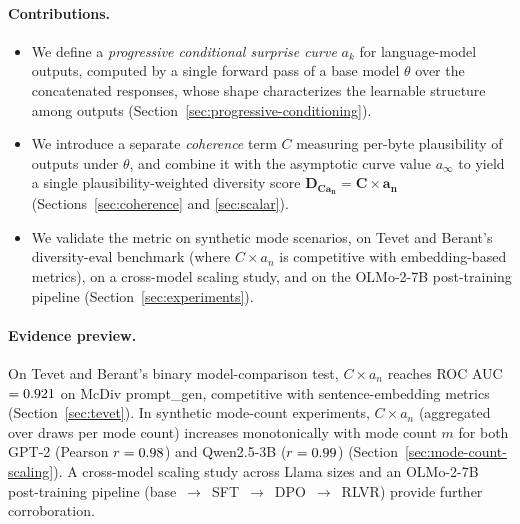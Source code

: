 \paragraph{Contributions.}
\begin{itemize}[leftmargin=*, itemsep=2pt]
  \item We define a \emph{progressive conditional surprise curve} $a_k$ for language-model outputs, computed by a single forward pass of a base model $\theta$ over the concatenated responses, whose shape characterizes the learnable structure among outputs (Section~\ref{sec:progressive-conditioning}).
  \item We introduce a separate \emph{coherence} term $C$ measuring per-byte plausibility of outputs under $\theta$, and combine it with the asymptotic curve value $a_\infty$ to yield a single plausibility-weighted diversity score $\mathbf{D_{Ca_n} = C \times a_n}$ (Sections~\ref{sec:coherence} and \ref{sec:scalar}).
  \item We validate the metric on synthetic mode scenarios, on Tevet and Berant's diversity-eval benchmark (where $C \times a_n$ is competitive with embedding-based metrics), on a cross-model scaling study, and on the OLMo-2-7B post-training pipeline (Section~\ref{sec:experiments}).
\end{itemize}

\paragraph{Evidence preview.}
On Tevet and Berant's binary model-comparison test, $C \times a_n$ reaches ROC AUC $= 0.921{}$ on McDiv prompt\_gen, competitive with sentence-embedding metrics (Section~\ref{sec:tevet}).
In synthetic mode-count experiments, $C \times a_n$ (aggregated over \modeCountNDraws{} draws per mode count) increases monotonically with mode count $m$ for both GPT-2 (Pearson $r = 0.98{}$) and Qwen2.5-3B ($r = 0.99{}$) (Section~\ref{sec:mode-count-scaling}).
A cross-model scaling study across \scalingNumLlamaModels{} Llama sizes and an OLMo-2-7B post-training pipeline (base~$\to$~SFT~$\to$~DPO~$\to$~RLVR) provide further corroboration.

